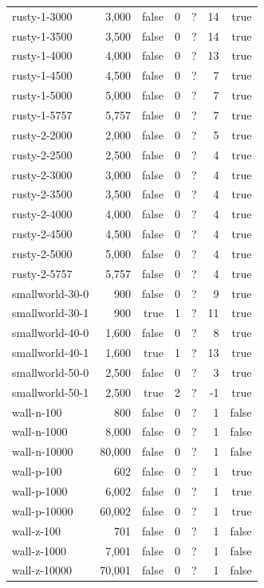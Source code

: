 \begin{tabular}{lrrrrrr}
  rusty-1-3000 & 3,000 & false & 0 & ? & 14 & true \\
  rusty-1-3500 & 3,500 & false & 0 & ? & 14 & true \\
  rusty-1-4000 & 4,000 & false & 0 & ? & 13 & true \\
  rusty-1-4500 & 4,500 & false & 0 & ? & 7 & true \\
  rusty-1-5000 & 5,000 & false & 0 & ? & 7 & true \\
  rusty-1-5757 & 5,757 & false & 0 & ? & 7 & true \\
  rusty-2-2000 & 2,000 & false & 0 & ? & 5 & true \\
  rusty-2-2500 & 2,500 & false & 0 & ? & 4 & true \\
  rusty-2-3000 & 3,000 & false & 0 & ? & 4 & true \\
  rusty-2-3500 & 3,500 & false & 0 & ? & 4 & true \\
  rusty-2-4000 & 4,000 & false & 0 & ? & 4 & true \\
  rusty-2-4500 & 4,500 & false & 0 & ? & 4 & true \\
  rusty-2-5000 & 5,000 & false & 0 & ? & 4 & true \\
  rusty-2-5757 & 5,757 & false & 0 & ? & 4 & true \\
  smallworld-30-0 & 900 & false & 0 & ? & 9 & true \\
  smallworld-30-1 & 900 & true & 1 & ? & 11 & true \\
  smallworld-40-0 & 1,600 & false & 0 & ? & 8 & true \\
  smallworld-40-1 & 1,600 & true & 1 & ? & 13 & true \\
  smallworld-50-0 & 2,500 & false & 0 & ? & 3 & true \\
  smallworld-50-1 & 2,500 & true & 2 & ? & -1 & true \\
  wall-n-100 & 800 & false & 0 & ? & 1 & false \\
  wall-n-1000 & 8,000 & false & 0 & ? & 1 & false \\
  wall-n-10000 & 80,000 & false & 0 & ? & 1 & false \\
  wall-p-100 & 602 & false & 0 & ? & 1 & true \\
  wall-p-1000 & 6,002 & false & 0 & ? & 1 & true \\
  wall-p-10000 & 60,002 & false & 0 & ? & 1 & true \\
  wall-z-100 & 701 & false & 0 & ? & 1 & false \\
  wall-z-1000 & 7,001 & false & 0 & ? & 1 & false \\
  wall-z-10000 & 70,001 & false & 0 & ? & 1 & false \\
  \bottomrule
\end{tabular}
\medskip
